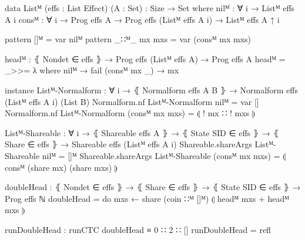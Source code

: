 \begin{code}[hide]
data Listᴹ (effs : List Effect) (A : Set) : {Size} → Set where
  nilᴹ  : ∀ {i} → Listᴹ effs A {i}
  consᴹ : ∀ {i} → Prog effs A → Prog effs (Listᴹ effs A {i}) → Listᴹ effs A {↑ i}

pattern []ᴹ         = var nilᴹ
pattern _∷ᴹ_ mx mxs = var (consᴹ mx mxs)

headᴹ : ⦃ Nondet ∈ effs ⦄ → Prog effs (Listᴹ effs A) → Prog effs A
headᴹ = _>>= λ where
  nilᴹ         → fail
  (consᴹ mx _) → mx

instance
  Listᴹ-Normalform : ∀ {i} → ⦃ Normalform effs A B ⦄ → Normalform effs (Listᴹ effs A {i}) (List B)
  Normalform.nf Listᴹ-Normalform nilᴹ           = var []
  Normalform.nf Listᴹ-Normalform (consᴹ mx mxs) = ⦇ ! mx ∷ ! mxs ⦈

  Listᴹ-Shareable : ∀ {i} → ⦃ Shareable effs A ⦄ → ⦃ State SID ∈ effs ⦄ → ⦃ Share ∈ effs ⦄ → Shareable effs (Listᴹ effs A {i})
  Shareable.shareArgs Listᴹ-Shareable nilᴹ           = []ᴹ
  Shareable.shareArgs Listᴹ-Shareable (consᴹ mx mxs) = ⦇ consᴹ (share mx) (share mxs) ⦈
\end{code}
\begin{code}
doubleHead : ⦃ Nondet ∈ effs ⦄ → ⦃ Share ∈ effs ⦄ → ⦃ State SID ∈ effs ⦄ →
  Prog effs ℕ
doubleHead = do mxs ← share (coin ∷ᴹ []ᴹ)
                ⦇ headᴹ mxs + headᴹ mxs ⦈

runDoubleHead : runCTC doubleHead ≡ 0 ∷ 2 ∷ []
runDoubleHead = refl
\end{code}
